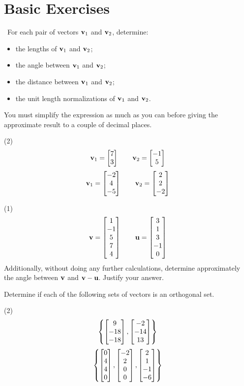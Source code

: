 \section{Basic Exercises}

\faCalculator \ For each pair of vectors $\mathbf v_1$ and $\mathbf v_2$, determine:
\begin{itemize}
\item the lengths of $\mathbf v_1$ and $\mathbf v_2$;
\item the angle between $\mathbf v_1$ and $\mathbf v_2$;
\item the distance between $\mathbf v_1$ and $\mathbf v_2$;
\item the unit length normalizations of $\mathbf v_1$ and $\mathbf v_2$.
\end{itemize}
You must simplify the expression as much as you can before giving the
approximate result to a couple of decimal places.
\begin{tasks}[style=enumerate](2)
\task
  \begin{displaymath}
    \mathbf v_1 =  \begin{bmatrix} 7 \\ 3 \end{bmatrix} 
    \qquad
    \mathbf v_2 =  \begin{bmatrix} -1 \\ 5 \end{bmatrix} 
  \end{displaymath}
\task
  \begin{displaymath}
    \mathbf v_1 =  \begin{bmatrix} -2 \\ 4 \\ -5 \end{bmatrix} 
    \qquad
    \mathbf v_2 =  \begin{bmatrix} 2 \\ 2 \\ -2 \end{bmatrix} 
  \end{displaymath}
\end{tasks}
\begin{tasks}[resume, style=enumerate](1)
\task
  \begin{displaymath}
    \mathbf v =  \begin{bmatrix} 1 \\ -1 \\ 5 \\ 7 \\ 4 \end{bmatrix} 
    \qquad
    \mathbf u =  \begin{bmatrix} 3 \\ 1 \\ 3 \\ -1 \\ 0 \end{bmatrix} 
  \end{displaymath}
  Additionally, without doing any further calculations, determine
  approximately the angle between $\mathbf v$ and $\mathbf v - \mathbf u$.  Justify your
  answer.
\end{tasks}
Determine if each of the following sets of vectors is an orthogonal set.
\begin{tasks}[resume, style=enumerate](2)
\task
  \begin{displaymath}
    \left\{
     \begin{bmatrix} 9 \\ -18 \\ -18 \end{bmatrix} ,
     \begin{bmatrix} -2 \\ -14 \\ 13 \end{bmatrix} 
    \right\}
  \end{displaymath}
\task
  \begin{displaymath}
    \left\{
     \begin{bmatrix} 0 \\ 4 \\ 4 \\ 0 \end{bmatrix} ,
     \begin{bmatrix} -2 \\ 2 \\ 0 \\ 0 \end{bmatrix} ,
     \begin{bmatrix} 2 \\ 1 \\ -1 \\ -6 \end{bmatrix} 
    \right\}
  \end{displaymath}
\end{tasks}
